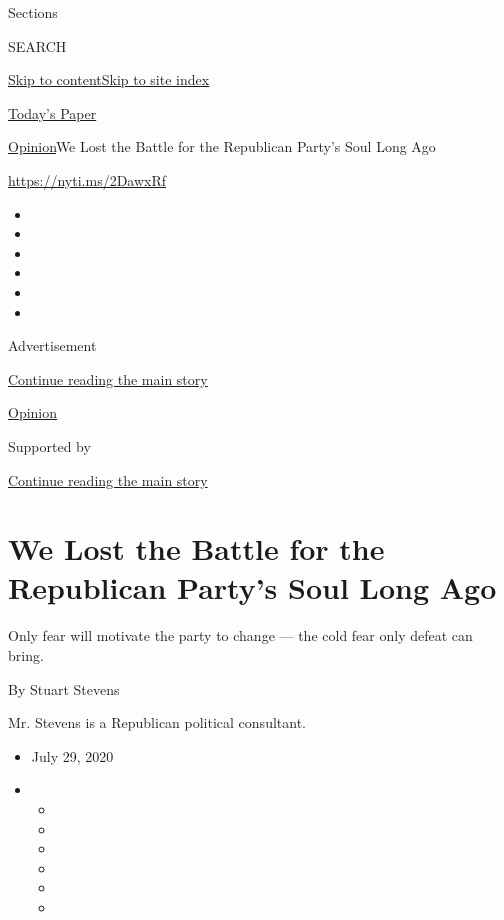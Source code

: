 Sections

SEARCH

\protect\hyperlink{site-content}{Skip to
content}\protect\hyperlink{site-index}{Skip to site index}

\href{https://myaccount.nytimes.com/auth/login?response_type=cookie\&client_id=vi}{}

\href{https://www.nytimes.com/section/todayspaper}{Today's Paper}

\href{/section/opinion}{Opinion}\textbar{}We Lost the Battle for the
Republican Party's Soul Long Ago

\url{https://nyti.ms/2DawxRf}

\begin{itemize}
\item
\item
\item
\item
\item
\item
\end{itemize}

Advertisement

\protect\hyperlink{after-top}{Continue reading the main story}

\href{/section/opinion}{Opinion}

Supported by

\protect\hyperlink{after-sponsor}{Continue reading the main story}

\hypertarget{we-lost-the-battle-for-the-republican-partys-soul-long-ago}{%
\section{We Lost the Battle for the Republican Party's Soul Long
Ago}\label{we-lost-the-battle-for-the-republican-partys-soul-long-ago}}

Only fear will motivate the party to change --- the cold fear only
defeat can bring.

By Stuart Stevens

Mr. Stevens is a Republican political consultant.

\begin{itemize}
\item
  July 29, 2020
\item
  \begin{itemize}
  \item
  \item
  \item
  \item
  \item
  \item
  \end{itemize}
\end{itemize}

